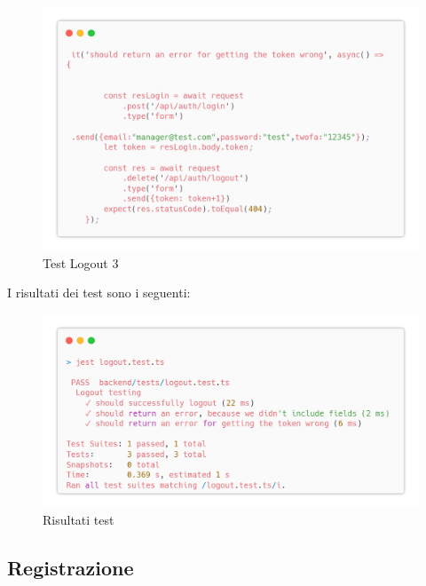 \documentclass{report}
\begin{document}
\begin{figure}[H]
	\centering\includegraphics[width=1\textwidth]{images/microservizio-autenticazione/tests/logout_test_3.png}
	\caption{Test Logout 3}
\end{figure}
I risultati dei test sono i seguenti:
\begin{figure}[H]
	\centering\includegraphics[width=1\textwidth]{images/microservizio-autenticazione/tests/logout_test_results.png}
	\caption{Risultati test}
\end{figure}
\subsection{Registrazione}
\end{document}
